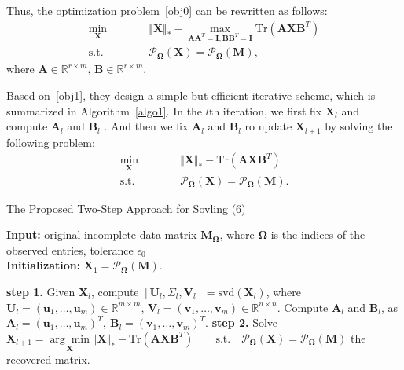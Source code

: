 \documentclass[fontset=windows]{article}
\begin{document}
{\begin{equation}
\end{equation}
Thus, the optimization problem~\eqref{obj0} can be rewritten as follows:
\begin{equation}
\begin{aligned}
    \min_{\mathbf X}\qquad&\quad  \Vert\mathbf X \Vert_* - \underset{\mathbf A\mathbf A^T=\mathbf I,\mathbf B\mathbf B^T=\mathbf I}{\max} \text{Tr}(\mathbf A\mathbf X\mathbf B^T) \\
    \text{s.t.}\qquad&\quad  \mathcal{P}_{\mathbf\Omega}(\mathbf X) =  \mathcal{P}_{\mathbf\Omega}(\mathbf M),
\end{aligned}\label{obj1}
\end{equation}
where $\mathbf A \in \mathbb{R}^{r \times m}$, $\mathbf B \in \mathbb{R}^{r \times m}$.

Based on~\eqref{obj1},  they design a simple but efficient iterative scheme, which is summarized in Algorithm~\ref{algo1}. In the $l$th iteration, we first fix $\mathbf X_l$ and compute $\mathbf A_l$ and $\mathbf B_l$ . And then we fix $\mathbf A_l$ and $\mathbf B_l$ ro update $\mathbf X_{l+1}$ by  solving the following problem:
\begin{equation}
\begin{aligned}
    \underset{\mathbf X}{\min}\qquad&\quad \Vert\mathbf X \Vert_* - \text{Tr}(\mathbf A\mathbf X\mathbf B^T) \\
    \text{s.t.}\qquad&\quad   \mathcal{P}_{\mathbf\Omega}(\mathbf X) =  \mathcal{P}_{\mathbf\Omega}(\mathbf M).
\end{aligned}\label{obj2}
\end{equation}

\begin{algorithm}[t]
    \caption{The Proposed Two-Step Approach for Sovling (6)}
    \label{algo1}
    \textbf{Input:} original incomplete data matrix $\mathbf M_{\mathbf\Omega}$, where $\mathbf \Omega$ is the indices of the observed entries, tolerance $\epsilon_0$ \\
    \textbf{Initialization:} $\mathbf X_1 = \mathcal{P}_{\mathbf\Omega}(\mathbf M)$. 
    \begin{algorithmic}
        \Repeat 
        \State \textbf{step 1.} Given $\mathbf X_l$, compute $[\mathbf U_l, \mathbf \varSigma_l, \mathbf V_l] = \text{svd}(\mathbf X_l)$, 
        \State where $\mathbf U_l = (\mathbf u_1,\dots,\mathbf u_m) \in \mathbb{R}^{m \times m}$, $\mathbf V_l = (\mathbf v_1,\dots,\mathbf v_m) \in \mathbb{R}^{n \times n}$. 
        \State Compute $\mathbf A_l$ and $\mathbf B_l$, as $\mathbf A_l = (\mathbf u_1,\dots,\mathbf u_m)^T, \ \mathbf B_l = (\mathbf v_1,\dots,\mathbf v_m)^T$.
        \State \textbf{step 2.} Solve $\mathbf X_{l+1} = \underset{\mathbf X}{\arg\min} \Vert\mathbf X \Vert_* - \text{Tr}(\mathbf A\mathbf X\mathbf B^T) \qquad \text{s.t.} \quad \mathcal{P}_{\mathbf\Omega}(\mathbf X) =  \mathcal{P}_{\mathbf\Omega}(\mathbf M)$ 
        \State \Return the recovered matrix.
    \end{algorithmic}
\end{algorithm}



}
\end{document}

